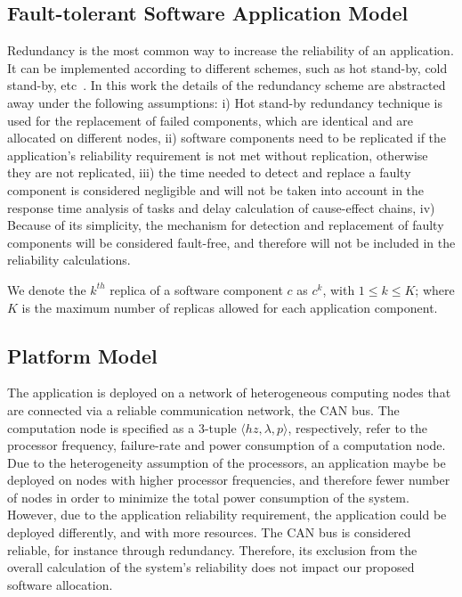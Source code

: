 \subsection{Fault-tolerant Software Application Model}
Redundancy is the most common way to increase the reliability of an application. It can be implemented according to different schemes, such as hot stand-by, cold stand-by, etc~\cite{Dubrova2013Fault-tolerantDesign}. In this work the details of the redundancy scheme are abstracted away under the following assumptions: i) Hot stand-by redundancy technique is used for the replacement of failed components, which are identical and are allocated on different nodes, ii) software components need to be replicated if the application's reliability requirement is not met without replication, otherwise they are not replicated, iii) the time needed to detect and replace a faulty component is considered negligible and will not be taken into account in the response time analysis of tasks and delay calculation of cause-effect chains, iv) Because of its simplicity, the mechanism for detection and replacement of faulty components will be considered fault-free, and therefore will not be included in the reliability calculations.

We denote the $k^{th}$ replica of a software component $c$ as $c^k$, with $1\le k\leq K$; where $K$ is the maximum number of replicas allowed for each application component.

\subsection{Platform Model}
The application is deployed on a network of heterogeneous computing nodes that are connected via a reliable communication network, the CAN bus. The computation node is specified as a 3-tuple $\langle hz, \lambda, p \rangle$, respectively, refer to the processor frequency, failure-rate and power consumption of a computation node. Due to the heterogeneity assumption of the processors, an application maybe be deployed on nodes with higher processor frequencies, and therefore fewer number of nodes in order to minimize the total power consumption of the system. However, due to the application reliability requirement, the application could be deployed differently, and with more resources. The CAN bus is considered reliable, for instance through redundancy. Therefore, its exclusion from the overall calculation of the system's reliability does not impact our proposed software allocation. %

